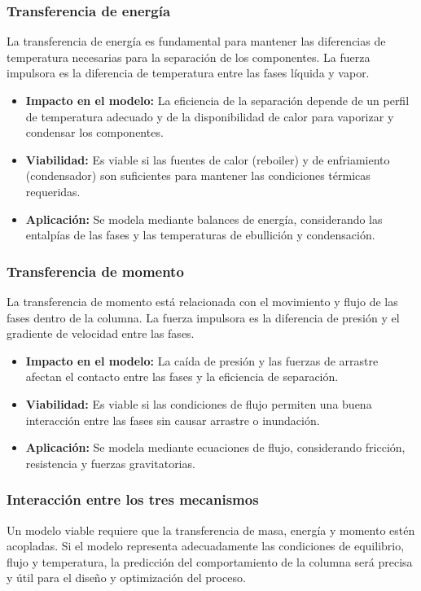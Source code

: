 \subsubsection{Transferencia de energía}
La transferencia de energía es fundamental para mantener las diferencias de temperatura necesarias para la separación de los componentes. La fuerza impulsora es la diferencia de temperatura entre las fases líquida y vapor.
\begin{itemize}
    \item \textbf{Impacto en el modelo:} La eficiencia de la separación depende de un perfil de temperatura adecuado y de la disponibilidad de calor para vaporizar y condensar los componentes.
    \item \textbf{Viabilidad:} Es viable si las fuentes de calor (reboiler) y de enfriamiento (condensador) son suficientes para mantener las condiciones térmicas requeridas.
    \item \textbf{Aplicación:} Se modela mediante balances de energía, considerando las entalpías de las fases y las temperaturas de ebullición y condensación.
\end{itemize}

\subsubsection{Transferencia de momento}
La transferencia de momento está relacionada con el movimiento y flujo de las fases dentro de la columna. La fuerza impulsora es la diferencia de presión y el gradiente de velocidad entre las fases.
\begin{itemize}
    \item \textbf{Impacto en el modelo:} La caída de presión y las fuerzas de arrastre afectan el contacto entre las fases y la eficiencia de separación.
    \item \textbf{Viabilidad:} Es viable si las condiciones de flujo permiten una buena interacción entre las fases sin causar arrastre o inundación.
    \item \textbf{Aplicación:} Se modela mediante ecuaciones de flujo, considerando fricción, resistencia y fuerzas gravitatorias.
\end{itemize}

\subsubsection{Interacción entre los tres mecanismos}
Un modelo viable requiere que la transferencia de masa, energía y momento estén acopladas. Si el modelo representa adecuadamente las condiciones de equilibrio, flujo y temperatura, la predicción del comportamiento de la columna será precisa y útil para el diseño y optimización del proceso.

